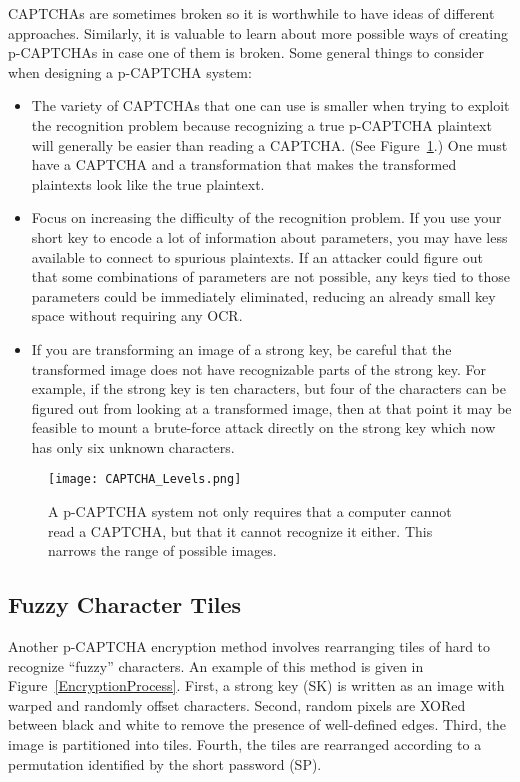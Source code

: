 \documentclass[12pt]{article}
\begin{document}
CAPTCHAs are sometimes broken so it is worthwhile to have ideas of different approaches. Similarly, it is valuable to learn about more possible ways of creating p-CAPTCHAs in case one of them is broken. Some general things to consider when designing a p-CAPTCHA system:
\begin{itemize}
\item The variety of CAPTCHAs that one can use is smaller when trying to exploit the recognition problem because recognizing a true p-CAPTCHA plaintext will generally be easier than reading a CAPTCHA. (See Figure~{\ref{CAPTCHALevels}}.) One must have a CAPTCHA and a transformation that makes the transformed plaintexts look like the true plaintext.
\item Focus on increasing the difficulty of the recognition problem. If you use your short key to encode a lot of information about parameters, you may have less available to connect to spurious plaintexts. If an attacker could figure out that some combinations of parameters are not possible, any keys tied to those parameters could be immediately eliminated, reducing an already small key space without requiring any OCR.
\item If you are transforming an image of a strong key, be careful that the transformed image does not have recognizable parts of the strong key. For example, if the strong key is ten characters, but four of the characters can be figured out from looking at a transformed image, then at that point it may be feasible to mount a brute-force attack directly on the strong key which now has only six unknown characters.
\end{itemize}

\begin{figure}
	\begin{center}
		\texttt{[image: CAPTCHA\_Levels.png]}
	\end{center}
	\caption{A p-CAPTCHA system not only requires that a computer cannot read a CAPTCHA, but that it cannot recognize it either. This narrows the range of possible images.}
\label{CAPTCHALevels}
\end{figure}


\subsection*{Fuzzy Character Tiles}
	Another p-CAPTCHA encryption method involves rearranging tiles of hard to recognize “fuzzy” characters. An example of this method is given in Figure~{\ref{EncryptionProcess}}. First, a strong key (SK) is written as an image with warped and randomly offset characters. Second, random pixels are XORed between black and white to remove the presence of well-defined edges. Third, the image is partitioned into tiles. Fourth, the tiles are rearranged according to a permutation identified by the short password (SP).
\end{document}
